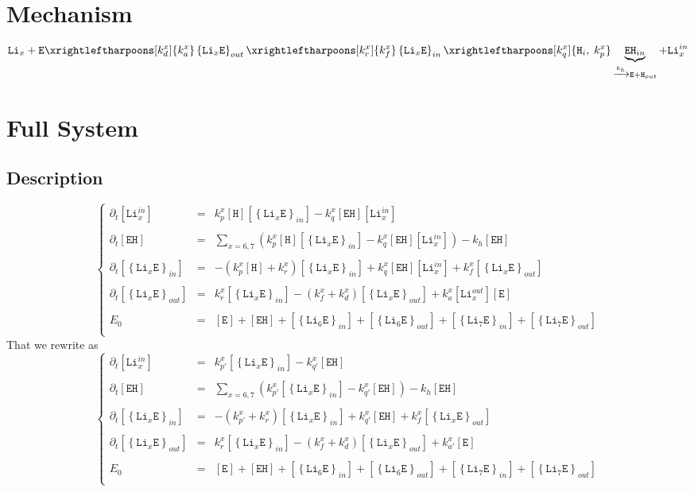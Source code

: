 \documentclass[aps,onecolumn,11pt]{revtex4}
\newcommand{\mychem}[1]{\mathtt{#1}}
\newcommand{\myconc}[1]{\left\lbrack{#1}\right\rbrack}
\newcommand{\LiEin}[1]{\myconc{\left\lbrace\mychem{Li}_{#1}\mychem{E}\right\rbrace_{in}}}
\newcommand{\LiEout}[1]{\myconc{\left\lbrace\mychem{Li}_{#1}\mychem{E}\right\rbrace_{out}}}
\newcommand{\LiIn}[1]{\myconc{\mychem{Li}_{#1}^{in}}}
\newcommand{\LiOut}[1]{\myconc{\mychem{Li}_{#1}^{out}}}
\newcommand{\EHin}{\myconc{\mychem{EH}}}
\newcommand{\Eout}{\myconc{\mychem{E}}}
\newcommand{\Hin}{\myconc{\mychem{H}}}
\begin{document}
\section{Mechanism}
\begin{equation}
	 \mychem{Li}_{x} +  \mychem{E}  
	 \xrightleftharpoons[k_d^x]{k_a^x} 
	 \left\lbrace\mychem{Li}_{x}\mychem{E}\right\rbrace_{out} 
	  \xrightleftharpoons[k_r^x]{k_f^x} 
	  \left\lbrace\mychem{Li}_{x}\mychem{E}\right\rbrace_{in}  
	  \xrightleftharpoons[k_q^x]{\mychem{H}_i,\;k_p^x} \underbrace{\mychem{EH}_{in}}_{\xrightarrow[]{k_h} \mychem{E} + \mychem{H}_{out}} + \mychem{Li}_{x}^{in}
\end{equation}

\section{Full System}
\subsection{Description}
\begin{equation}
\displaystyle
\left\lbrace
\begin{array}{rcl}
\partial_t\LiIn{x}   & = & k_p^x \Hin \LiEin{x} - k_q^x \EHin \LiIn{x} \\
\\
\partial_t \EHin     & = & \displaystyle\sum_{x=6,7}\left( k_p^x \Hin \LiEin{x} - k_q^x \EHin \LiIn{x}\right) - k_h \EHin \\
\\
\partial_t \LiEin{x} & = & -\left(k_p^x \Hin + k_r^x\right) \LiEin{x} + k_q^x \EHin \LiIn{x}
+ k_f^x \LiEout{x} \\
\\
\partial_t \LiEout{x} & = & k_r^x \LiEin{x} - (k_f^x+k_d^x) \LiEout{x} + k_a^x \LiOut{x} \Eout \\
\\
E_0 & = & \Eout + \EHin + \LiEin{6} + \LiEout{6} + \LiEin{7}+\LiEout{7}\\
\end{array}
\right.
\end{equation}
That we rewrite as
\begin{equation}
\displaystyle
\left\lbrace
\begin{array}{rcl}
\partial_t\LiIn{x}   & = & k_{p'}^x \LiEin{x} - k_{q'}^x \EHin  \\
\\
\partial_t \EHin     & = & \displaystyle\sum_{x=6,7}\left( k_{p'}^x \LiEin{x} - k_{q'}^x \EHin \right) - k_h \EHin \\
\\
\partial_t \LiEin{x} & = & -\left(k_{p'}^x + k_r^x\right) \LiEin{x} + k_{q'}^x \EHin
+ k_f^x \LiEout{x} \\
\\
\partial_t \LiEout{x} & = & k_r^x \LiEin{x} - (k_f^x+k_d^x) \LiEout{x} + k_{a'}^x  \Eout \\
\\
E_0 & = & \Eout + \EHin + \LiEin{6} + \LiEout{6} + \LiEin{7}+\LiEout{7}\\
\end{array}
\right.
\end{equation}
\end{document}
